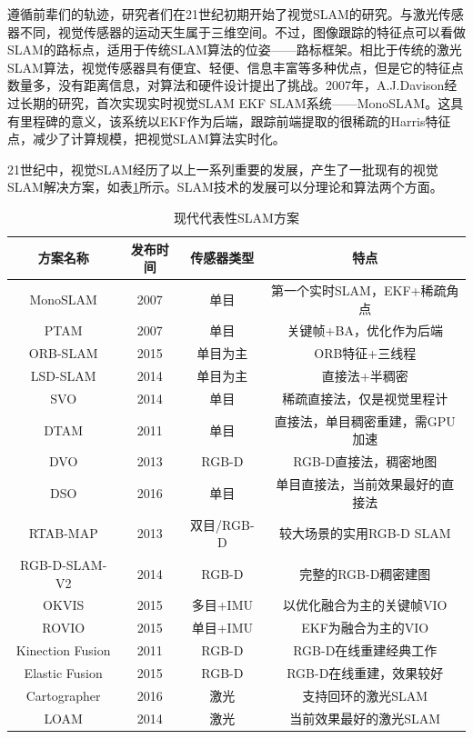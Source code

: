 遵循前辈们的轨迹，研究者们在21世纪初期开始了视觉SLAM的研究。与激光传感器不同，视觉传感器的运动天生属于三维空间。不过，图像跟踪的特征点可以看做SLAM的路标点，适用于传统SLAM算法的位姿——路标框架。相比于传统的激光SLAM算法，视觉传感器具有便宜、轻便、信息丰富等多种优点，但是它的特征点数量多，没有距离信息，对算法和硬件设计提出了挑战。2007年，A.J.Davison经过长期的研究，首次实现实时视觉SLAM EKF SLAM系统——MonoSLAM。这具有里程碑的意义，该系统以EKF作为后端，跟踪前端提取的很稀疏的Harris特征点，减少了计算规模，把视觉SLAM算法实时化。

21世纪中，视觉SLAM经历了以上一系列重要的发展，产生了一批现有的视觉SLAM解决方案，如表\ref{tab1.1}所示。SLAM技术的发展可以分理论和算法两个方面。

\begin{table}		%
\newcommand{\tabincell}[2]{\begin{tabular}{@{}#1@{}}#2\end{tabular}}		%
\renewcommand\arraystretch{1}		%
\centering
\caption{现代代表性SLAM方案\upcite{}}   %
\label{tab1.1}
	\begin{tabular*}{\textwidth}{@{\extracolsep{\fill}}cccc}  %
	\toprule
	方案名称 &发布时间 &传感器类型 &特点 \\
	\midrule
	MonoSLAM	&2007		&单目		&第一个实时SLAM，EKF+稀疏角点		\\
	PTAM		&2007 		&单目		&关键帧+BA，优化作为后端 			\\
	ORB-SLAM	&2015		&单目为主		&ORB特征+三线程 					\\
	LSD-SLAM	&2014		&单目为主 	&直接法+半稠密 					\\
	SVO			&2014		&单目		&稀疏直接法，仅是视觉里程计 			\\
	DTAM		&2011		&单目		&直接法，单目稠密重建，需GPU加速		\\
	DVO			&2013		&RGB-D		&RGB-D直接法，稠密地图				\\
	DSO			&2016		&单目		&单目直接法，当前效果最好的直接法		\\
	RTAB-MAP	&2013		&双目/RGB-D	&较大场景的实用RGB-D SLAM			\\
	RGB-D-SLAM-V2 &2014		&RGB-D		&完整的RGB-D稠密建图				\\
	OKVIS		&2015		&多目+IMU	&以优化融合为主的关键帧VIO			\\
	ROVIO		&2015		&单目+IMU	&EKF为融合为主的VIO				\\
	Kinection Fusion &2011	&RGB-D		&RGB-D在线重建经典工作				\\
	Elastic Fusion &2015	&RGB-D		&RGB-D在线重建，效果较好			\\
	Cartographer	&2016	&激光		&支持回环的激光SLAM				\\
	LOAM		&2014		&激光		&当前效果最好的激光SLAM			\\				
	\bottomrule
	\end{tabular*}
\end{table}

